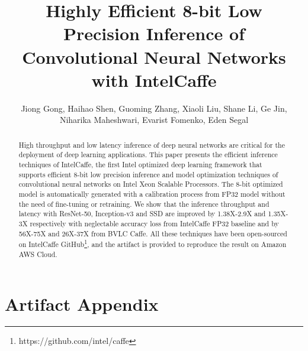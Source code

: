 \documentclass[sigplan]{acmart}
\begin{document}
\title{Highly Efficient 8-bit Low Precision Inference of Convolutional Neural Networks with IntelCaffe \\}

\author{Jiong Gong, Haihao Shen, Guoming Zhang, Xiaoli Liu, Shane Li, Ge Jin, Niharika Maheshwari, Evarist Fomenko, Eden Segal}

\renewcommand{\shortauthors}{}
\renewcommand{\shorttitle}{}

\begin{abstract}
High throughput and low latency inference of deep neural networks are critical for the deployment of deep learning applications. This paper presents the efficient inference techniques of IntelCaffe, the first Intel\textsuperscript{\textregistered} optimized deep learning framework that supports efficient 8-bit low precision inference and model optimization techniques of convolutional neural networks on Intel\textsuperscript{\textregistered} Xeon\textsuperscript{\textregistered} Scalable Processors. The 8-bit optimized model is automatically generated with a calibration process from FP32 model without the need of fine-tuning or retraining. We show that the inference throughput and latency with ResNet-50, Inception-v3 and SSD are improved by 1.38X-2.9X and 1.35X-3X respectively with neglectable accuracy loss from IntelCaffe FP32 baseline and by 56X-75X and 26X-37X from BVLC Caffe. All these techniques have been open-sourced on IntelCaffe GitHub\footnote{https://github.com/intel/caffe}, and the artifact is provided to reproduce the result on Amazon AWS Cloud.
\end{abstract}


\maketitle






\newpage

\onecolumn

\appendix
\section{Artifact Appendix}
\end{document}
